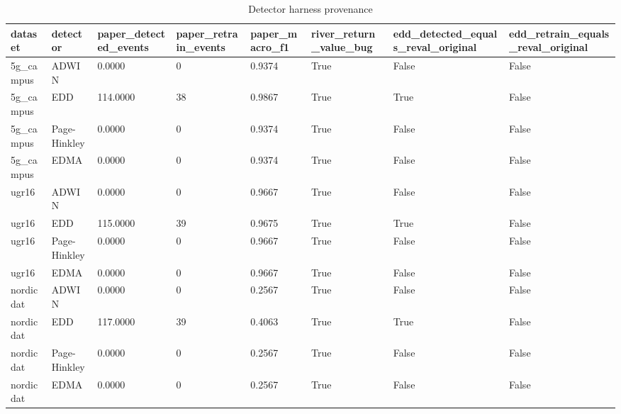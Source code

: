 \begin{table}[t]
\centering
\caption{Detector harness provenance}
\label{tab:t1}
\begin{tabular}{llllllll}
\toprule
dataset & detector & paper\_detected\_events & paper\_retrain\_events & paper\_macro\_f1 & river\_return\_value\_bug & edd\_detected\_equals\_reval\_original & edd\_retrain\_equals\_reval\_original \\
\midrule
5g\_campus & ADWIN & 0.0000 & 0 & 0.9374 & True & False & False \\
5g\_campus & EDD & 114.0000 & 38 & 0.9867 & True & True & False \\
5g\_campus & Page-Hinkley & 0.0000 & 0 & 0.9374 & True & False & False \\
5g\_campus & EDMA & 0.0000 & 0 & 0.9374 & True & False & False \\
ugr16 & ADWIN & 0.0000 & 0 & 0.9667 & True & False & False \\
ugr16 & EDD & 115.0000 & 39 & 0.9675 & True & True & False \\
ugr16 & Page-Hinkley & 0.0000 & 0 & 0.9667 & True & False & False \\
ugr16 & EDMA & 0.0000 & 0 & 0.9667 & True & False & False \\
nordicdat & ADWIN & 0.0000 & 0 & 0.2567 & True & False & False \\
nordicdat & EDD & 117.0000 & 39 & 0.4063 & True & True & False \\
nordicdat & Page-Hinkley & 0.0000 & 0 & 0.2567 & True & False & False \\
nordicdat & EDMA & 0.0000 & 0 & 0.2567 & True & False & False \\
\bottomrule
\end{tabular}
\end{table}
